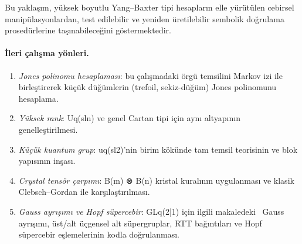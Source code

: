 \documentclass[12pt,a4paper]{report}
\numberwithin{equation}{chapter}
\theoremstyle{plain}
\theoremstyle{definition}
\begin{document}
Bu yaklaşım, yüksek boyutlu Yang--Baxter tipi hesapların elle yürütülen
cebirsel manipülasyonlardan, test edilebilir ve yeniden üretilebilir sembolik
doğrulama prosedürlerine taşınabileceğini göstermektedir.

\paragraph{İleri çalışma yönleri.}
\begin{enumerate}[leftmargin=*]
  \item \emph{Jones polinomu hesaplaması}: bu çalışmadaki örgü temsilini Markov
        izi ile birleştirerek küçük düğümlerin (trefoil, sekiz-düğüm) Jones
        polinomunu hesaplama.
  \item \emph{Yüksek rank}: Uq(sln) ve genel Cartan tipi için aynı
        altyapının genelleştirilmesi.
  \item \emph{Küçük kuantum grup}: uq(sl2)'nin birim kökünde tam
        temsil teorisinin ve blok yapısının inşası.
  \item \emph{Crystal tensör çarpımı}: B(m) ⊗ B(n) kristal
        kuralının uygulanması ve klasik Clebsch--Gordan ile karşılaştırılması.
  \item \emph{Gauss ayrışımı ve Hopf süpercebir}: GLq(2|1) için
        ilgili makaledeki~\cite{CelikGL21} Gauss ayrışımı, üst/alt üçgensel alt süpergruplar, RTT
        bağıntıları ve Hopf süpercebir eşlemelerinin kodla doğrulanması.
\end{enumerate}

\FloatBarrier
\end{document}
